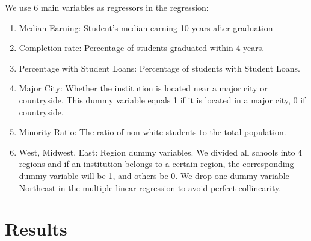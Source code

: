 \documentclass{article}
\begin{document}
We use 6 main variables as regressors in the regression:
\begin{enumerate} 
  \item Median Earning: Student's median earning 10 years after graduation

  \item Completion rate: Percentage of students graduated within 4 years.

  \item Percentage with Student Loans: Percentage of students with Student Loans.

  \item Major City: Whether the institution is located near a major city or countryside. This dummy variable equals 1 if it is located in a major city, 0 if countryside.

  \item Minority Ratio: The ratio of non-white students to the total population.

  \item West, Midwest, East: Region dummy variables. We divided all schools into 4 regions and if an institution belongs to a certain region, the corresponding dummy variable will be 1, and others be 0. We drop one dummy variable Northeast in the multiple linear regression to avoid perfect collinearity.
\end{enumerate}

\section{Results}
\end{document}
